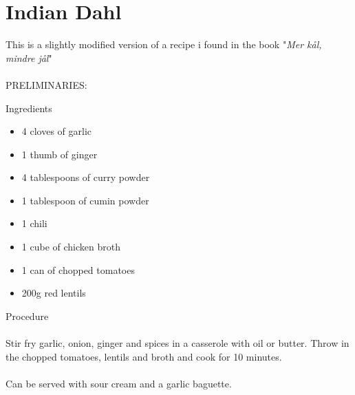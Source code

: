 \section{Indian Dahl}
This is a slightly modified version of a recipe i found in the book "\emph{Mer k\aa l, mindre j\aa l}" \\ \\
PRELIMINARIES: \\


\bigskip

\bigskip

\begin{multicols}{2}
Ingredients
\begin{itemize}
\item 4 cloves of garlic
\item 1 thumb of ginger
\item 4 tablespoons of curry powder
\item 1 tablespoon of cumin powder
\item 1 chili 
\item 1 cube of chicken broth
\item 1 can of chopped tomatoes 
\item 200g red lentils
\end{itemize}
\columnbreak
Procedure \\ \\ Stir fry garlic, onion, ginger and spices in a casserole with oil or butter. Throw in the chopped tomatoes, lentils and broth and cook for 10 minutes. \\ \\
Can be served with sour cream and a garlic baguette.
\end{multicols}




